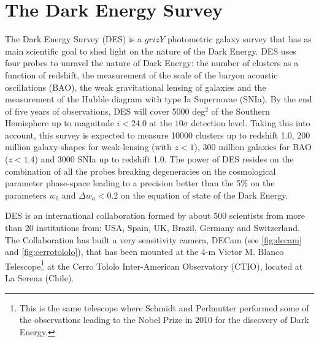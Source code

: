 \chapter{The Dark Energy Survey}
\label{ch:DES}

The Dark Energy Survey (DES) \cite{2005astro.ph.10346T} is a $grizY$ photometric galaxy survey that has as main scientific goal to shed light on the nature of the Dark Energy. DES uses four probes to unravel the nature of Dark Energy: the number of clusters as a function of redshift, the measurement of the scale of the baryon acoustic oscillations (BAO), the weak gravitational lensing of galaxies and the measurement of the Hubble diagram with type Ia Supernovae (SNIa). By the end of five years of observations, DES will cover 5000 deg$^2$ of the Southern Hemisphere up to magnitude $i<24.0$ at the $10\sigma$ detection level. Taking this into account, this survey is expected to measure 10000 clusters up to redshift 1.0, 200 million galaxy-shapes for weak-lensing (with $z<1$), 300 million galaxies for BAO ($z<1.4$) and 3000 SNIa up to redshift 1.0. The power of DES resides on the combination of all the probes breaking degeneracies on the cosmological parameter phase-space leading to a precision better than the 5\% on the parameters $w_0$ and $\Delta w_a<0.2$ on the equation of state of the Dark Energy.
\newline

DES is an international collaboration formed by about 500 scientists from more than 20 institutions from: USA, Spain, UK, Brazil, Germany and Switzerland. The Collaboration has built a very sensitivity camera, DECam (see \autoref{fig:decam} and \autoref{fig:cerrotololo}), that has been mounted at the 4-m Victor M. Blanco Telescope\footnote{This is the same telescope where Schmidt and Perlmutter performed some of the observations leading to the Nobel Prize in 2010 for the discovery of Dark Energy.} at the Cerro Tololo Inter-American Observatory (CTIO), located at La Serena (Chile).

